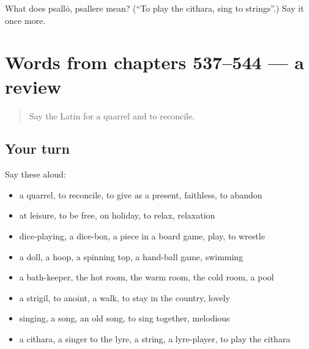 \begin{tcolorbox}[breakable,colback=teal!4,colframe=teal!35!black,title={Before you move on}]
What does psallō, psallere mean? (\textquotedblleft{}To play the cithara, sing to strings\textquotedblright{}.) Say it once more.
\end{tcolorbox}
\section[(dialogue)]{Words from chapters 537–544 — a review}

\label{lesson:LA-R544-review-537-544}



\begin{quote}
Say the Latin for a quarrel and to reconcile.
\end{quote}

\subsection*{Your turn}
Say these aloud:

\begin{itemize}
\raggedright
  \item a quarrel, to reconcile, to give as a present, faithless, to abandon
  \item at leisure, to be free, on holiday, to relax, relaxation
  \item dice-playing, a dice-box, a piece in a board game, play, to wrestle
  \item a doll, a hoop, a spinning top, a hand-ball game, swimming
  \item a bath-keeper, the hot room, the warm room, the cold room, a pool
  \item a strigil, to anoint, a walk, to stay in the country, lovely
  \item singing, a song, an old song, to sing together, melodious
  \item a cithara, a singer to the lyre, a string, a lyre-player, to play the cithara
\end{itemize}

